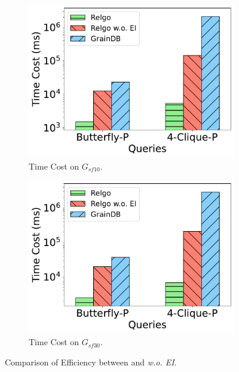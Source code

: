 \begin{figure}[ht]
    \centering
    \begin{subfigure}[b]{.45\linewidth}
        \centering
        \includegraphics[width=\linewidth]{./figures/exp/ablation_ei_para_sf10.pdf}
        \caption{Time Cost on $G_{sf10}$.}
        \label{fig:exp-expand-intersect-sf10}
    \end{subfigure}
    \begin{subfigure}[b]{0.45\linewidth}
        \centering
        \includegraphics[width=\linewidth]{./figures/exp/ablation_ei_para_sf30.pdf}
        \caption{Time Cost on $G_{sf30}$.}
        \label{fig:exp-expand-intersect-sf30}
    \end{subfigure}
    \caption{Comparison of Efficiency between \name and \textit{\name w.o. EI}.}
    \label{fig:exp-expand-intersect}
\end{figure}

